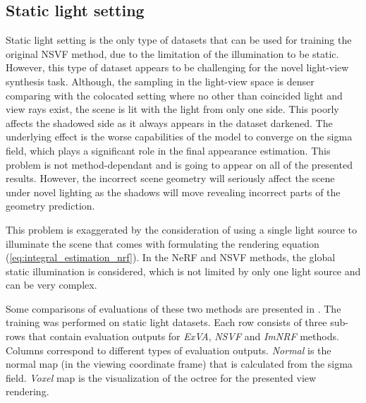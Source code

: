 





\subsection{Static light setting}

Static light setting is the only type of datasets that can be used
for training the original NSVF method,
due to the limitation of the illumination to be static.
However, this type of dataset appears to be challenging for the novel light-view synthesis task.
Although, the sampling in the light-view space is denser comparing with the colocated setting
where no other than coincided light and view rays exist,
the scene is lit with the light from only one side.
This poorly affects the shadowed side as it always appears in the dataset darkened.
The underlying effect is the worse capabilities of the model to converge on the sigma field,
which plays a significant role in the final appearance estimation.
This problem is not method-dependant and is going to appear on all of the presented results.
However, the incorrect scene geometry will seriously affect the scene under novel lighting
as the shadows will move revealing incorrect parts of the geometry prediction.

This problem is exaggerated by the consideration of using a single light source to illuminate the scene
that comes with formulating the rendering equation (\cref{eq:integral_estimation_nrf}).
In the NeRF and NSVF methods, the global static illumination is considered,
which is not limited by only one light source and can be very complex.





Some comparisons of evaluations of these two methods are presented in .
The training was performed on static light datasets.
Each row consists of three sub-rows that contain evaluation outputs for \textit{ExVA}, \textit{NSVF} and \textit{ImNRF} methods.
Columns correspond to different types of evaluation outputs.
\textit{Normal} is the normal map (in the viewing coordinate frame)
that is calculated from the sigma field.
\textit{Voxel} map is the visualization of the octree for the presented view rendering.

